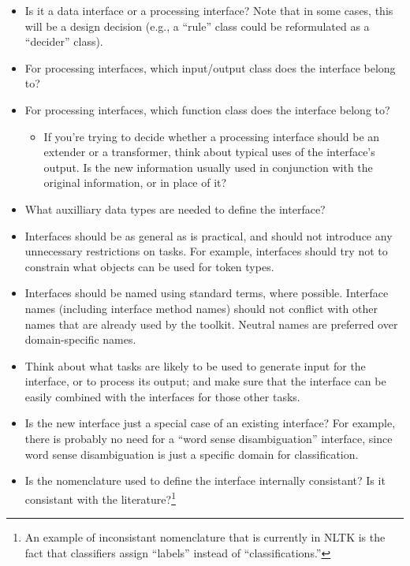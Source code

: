 \documentclass[11pt]{article}
\begin{document}
\begin{itemize}
\item Is it a data interface or a processing interface?  Note that in
  some cases, this will be a design decision (e.g., a ``rule'' class
  could be reformulated as a ``decider'' class).
\item For processing interfaces, which input/output class does the
  interface belong to?
\item For processing interfaces, which function class does the
  interface belong to?
  \begin{itemize}
  \item If you're trying to decide whether a processing interface
    should be an extender or a transformer, think about typical uses
    of the interface's output.  Is the new information usually used in
    conjunction with the original information, or in place of it?
  \end{itemize}
\item What auxilliary data types are needed to define the interface?
\item Interfaces should be as general as is practical, and should not
  introduce any unnecessary restrictions on tasks.  For example,
  interfaces should try not to constrain what objects can be used for
  token types.
\item Interfaces should be named using standard terms, where possible.
  Interface names (including interface method names) should not
  conflict with other names that are already used by the toolkit.
  Neutral names are preferred over domain-specific names.
\item Think about what tasks are likely to be used to generate input
  for the interface, or to process its output; and make sure that the
  interface can be easily combined with the interfaces for those other
  tasks.
\item Is the new interface just a special case of an existing
  interface?  For example, there is probably no need for a ``word
  sense disambiguation'' interface, since word sense disambiguation is
  just a specific domain for classification.
\item Is the nomenclature used to define the interface internally
  consistant?  Is it consistant with the literature?\footnote{An
    example of inconsistant nomenclature that is currently in NLTK is
    the fact that classifiers assign ``labels'' instead of
    ``classifications.''}
  
\end{itemize}
\end{document}
